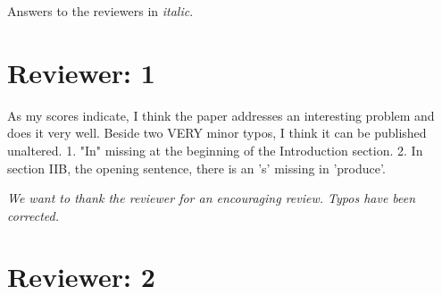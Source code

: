 \documentclass{article}
\begin{document}
Answers to the reviewers in \textit{italic}.

\section*{Reviewer: 1}

As my scores indicate, I think the paper addresses an interesting problem and does it very well. Beside two VERY minor typos, I think it can be published unaltered.
1. "In" missing at the beginning of the Introduction section.
2. In section IIB, the opening sentence, there is an 's' missing in 'produce'.

\textit{We want to thank the reviewer for an encouraging review. Typos have been corrected.}

\section*{Reviewer: 2}
\end{document}
